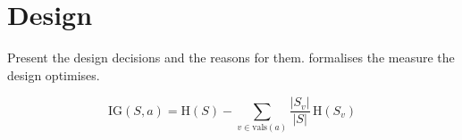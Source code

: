 \chapter{Design}
Present the design decisions and the reasons for them.  formalises the measure the design optimises.

\begin{equation}
  \label{eq:information-gain}
  \mathrm{IG}(S, a) = \mathrm{H}(S) - \sum_{v \in \mathrm{vals}(a)}
  \frac{|S_v|}{|S|}\,\mathrm{H}(S_v)
\end{equation}


